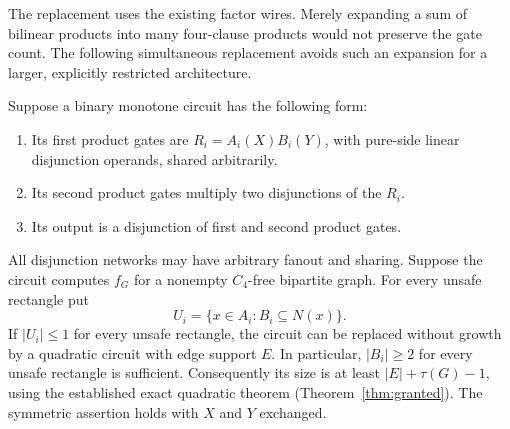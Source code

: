 The replacement uses the existing factor wires.  Merely expanding a sum
of bilinear products into many four-clause products would not preserve
the gate count.  The following simultaneous replacement avoids such
an expansion for a larger, explicitly restricted architecture.

\begin{theorem}
Suppose a binary monotone circuit has the following form:
\begin{enumerate}
\item Its first product gates are $R_i=A_i(X)B_i(Y)$, with pure-side
linear disjunction operands, shared arbitrarily.
\item Its second product gates multiply two disjunctions of the $R_i$.
\item Its output is a disjunction of first and second product gates.
\end{enumerate}
All disjunction networks may have arbitrary fanout and sharing.
Suppose the circuit computes $f_G$ for a nonempty $C_4$-free bipartite
graph.  For every unsafe rectangle put
\[
 U_i=\{x\in A_i:B_i\subseteq N(x)\}.
\]
If $|U_i|\leq1$ for every unsafe rectangle, the circuit can be
replaced without growth by a quadratic circuit with edge support $E$.
In particular, $|B_i|\geq2$ for every unsafe rectangle is sufficient.  Consequently its size is at
least $|E|+\tau(G)-1$, using the established exact quadratic theorem (Theorem~\ref{thm:granted}).
The symmetric assertion holds with $X$ and $Y$ exchanged.
\end{theorem}
